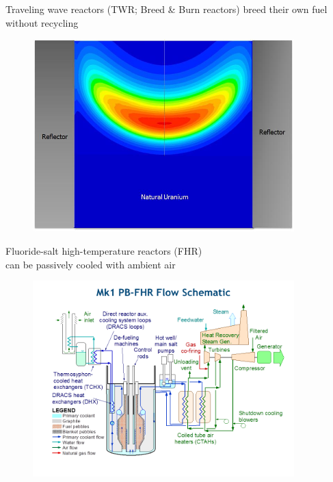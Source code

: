 \documentclass{beamer}
\begin{document}
        \begin{frame}{Traveling wave reactors (TWR; Breed \& Burn reactors) breed their own fuel without recycling}
            \begin{figure}
                \centering
                \includegraphics[width=0.9\textwidth]{./img/candle.png}
                \caption*{}
            \end{figure}
        \end{frame}

        \begin{frame}{Fluoride-salt high-temperature reactors (FHR) \\ can be passively cooled with ambient air}
            \begin{figure}
                \centering
                \includegraphics[width=0.9\textwidth]{./img/fhrBop.png}
                \caption*{}
            \end{figure}
        \end{frame}
\end{document}
